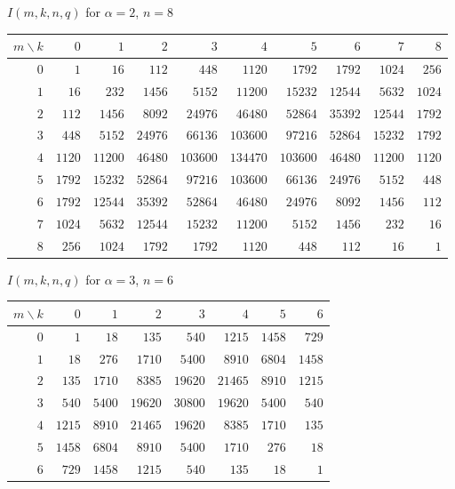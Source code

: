 \documentclass[11pt,a4paper]{article}
\theoremstyle{plain}
\theoremstyle{definition}
\begin{document}
\begin{tcolorbox}[colback=black!5, colframe=black!5, boxrule=0pt,
  sharp corners]
\begin{center}
$I(m,k,n,q)$ for $\alpha = 2$, $n = 8$

\medskip
\small
\begin{tabular}{r|rrrrrrrrr}
$m \!\backslash\! k$ & $0$ & $1$ & $2$ & $3$ & $4$ & $5$ & $6$ & $7$ & $8$ \\
\hline
$0$ & $1$ & $16$ & $112$ & $448$ & $1120$ & $1792$ & $1792$ & $1024$ & $256$ \\
$1$ & $16$ & $232$ & $1456$ & $5152$ & $11200$ & $15232$ & $12544$ & $5632$ & $1024$ \\
$2$ & $112$ & $1456$ & $8092$ & $24976$ & $46480$ & $52864$ & $35392$ & $12544$ & $1792$ \\
$3$ & $448$ & $5152$ & $24976$ & $66136$ & $103600$ & $97216$ & $52864$ & $15232$ & $1792$ \\
$4$ & $1120$ & $11200$ & $46480$ & $103600$ & $134470$ & $103600$ & $46480$ & $11200$ & $1120$ \\
$5$ & $1792$ & $15232$ & $52864$ & $97216$ & $103600$ & $66136$ & $24976$ & $5152$ & $448$ \\
$6$ & $1792$ & $12544$ & $35392$ & $52864$ & $46480$ & $24976$ & $8092$ & $1456$ & $112$ \\
$7$ & $1024$ & $5632$ & $12544$ & $15232$ & $11200$ & $5152$ & $1456$ & $232$ & $16$ \\
$8$ & $256$ & $1024$ & $1792$ & $1792$ & $1120$ & $448$ & $112$ & $16$ & $1$ \\
\end{tabular}
\end{center}
\end{tcolorbox}

\begin{tcolorbox}[colback=black!5, colframe=black!5, boxrule=0pt,
  sharp corners]
\begin{center}
$I(m,k,n,q)$ for $\alpha = 3$, $n = 6$

\medskip
\begin{tabular}{r|rrrrrrr}
$m \!\backslash\! k$ & $0$ & $1$ & $2$ & $3$ & $4$ & $5$ & $6$ \\
\hline
$0$ & $1$ & $18$ & $135$ & $540$ & $1215$ & $1458$ & $729$ \\
$1$ & $18$ & $276$ & $1710$ & $5400$ & $8910$ & $6804$ & $1458$ \\
$2$ & $135$ & $1710$ & $8385$ & $19620$ & $21465$ & $8910$ & $1215$ \\
$3$ & $540$ & $5400$ & $19620$ & $30800$ & $19620$ & $5400$ & $540$ \\
$4$ & $1215$ & $8910$ & $21465$ & $19620$ & $8385$ & $1710$ & $135$ \\
$5$ & $1458$ & $6804$ & $8910$ & $5400$ & $1710$ & $276$ & $18$ \\
$6$ & $729$ & $1458$ & $1215$ & $540$ & $135$ & $18$ & $1$ \\
\end{tabular}
\end{center}
\end{tcolorbox}
\end{document}

